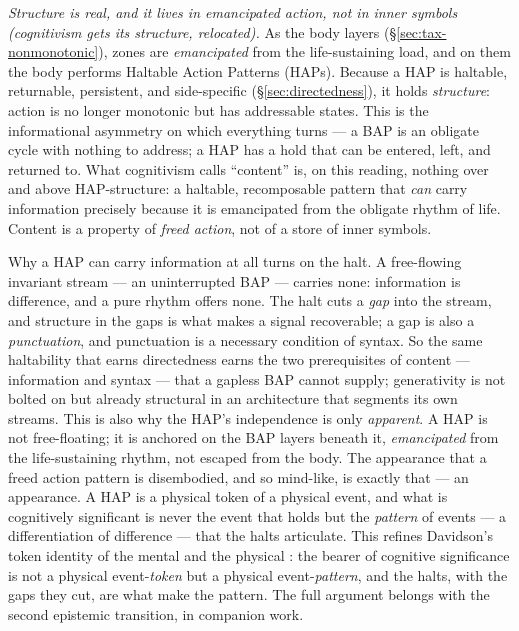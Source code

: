 \documentclass{article}
\begin{document}
\emph{Structure is real, and it lives in emancipated action, not in inner
symbols (cognitivism gets its structure, relocated).}  As the body layers
(\S\ref{sec:tax-nonmonotonic}), zones are \emph{emancipated} from the
life-sustaining load, and on them the body performs Haltable Action Patterns
(HAPs).  Because a HAP is haltable, returnable, persistent, and side-specific
(\S\ref{sec:directedness}), it holds \emph{structure}: action is no longer
monotonic but has addressable states.  This is the informational asymmetry on
which everything turns --- a BAP is an obligate cycle with nothing to address; a
HAP has a hold that can be entered, left, and returned to.  What cognitivism
calls ``content'' is, on this reading, nothing over and above HAP-structure: a
haltable, recomposable pattern that \emph{can} carry information precisely
because it is emancipated from the obligate rhythm of life.  Content is a
property of \emph{freed action}, not of a store of inner symbols.

Why a HAP can carry information at all turns on the halt.  A free-flowing
invariant stream --- an uninterrupted BAP --- carries none: information is
difference, and a pure rhythm offers none.  The halt cuts a \emph{gap} into
the stream, and structure in the gaps is what makes a signal recoverable; a
gap is also a \emph{punctuation}, and punctuation is a necessary condition
of syntax.  So the same haltability that earns directedness earns the two
prerequisites of content --- information and syntax --- that a gapless BAP
cannot supply; generativity is not bolted on but already structural in an
architecture that segments its own streams.  This is also why the HAP's
independence is only \emph{apparent}.  A HAP is not free-floating; it is
anchored on the BAP layers beneath it, \emph{emancipated} from the
life-sustaining rhythm, not escaped from the body.  The appearance that a
freed action pattern is disembodied, and so mind-like, is exactly that ---
an appearance.  A HAP is a physical token of a physical event, and what is
cognitively significant is never the event that holds but the \emph{pattern}
of events --- a differentiation of difference --- that the halts articulate.
This refines Davidson's token identity of the mental and the physical
\citep{Davidson1980EssaysActionsEvents}: the bearer of cognitive
significance is not a physical event-\emph{token} but a physical
event-\emph{pattern}, and the halts, with the gaps they cut, are what make
the pattern.  The full argument belongs with the second epistemic
transition, in companion work.
\end{document}
